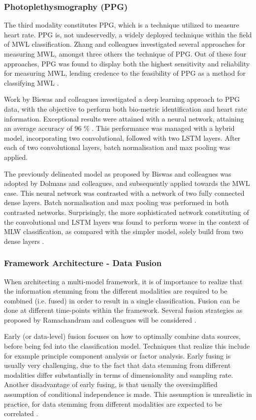 \documentclass{article}
\begin{document}
\subsubsection{Photoplethysmography (PPG)}
The third modality constitutes PPG, which is a technique utilized to measure heart rate. PPG is, not undeservedly, a widely deployed technique within the field of MWL classification. Zhang and colleagues investigated several approaches for measuring MWL, amongst three others the technique of PPG. Out of these four approaches, PPG was found to display both the highest sensitivity and reliability for measuring MWL, lending credence to the feasibility of PPG as a method for classifying MWL \cite{zhang2018evaluating}. 

Work by Biswas and colleagues investigated a deep learning approach to PPG data, with the objective to perform both bio-metric identification and heart rate information. Exceptional results were attained with a neural network, attaining an average accuracy of 96 \% \cite{biswas2019cornet}. This performance was managed with a hybrid model, incorporating two convolutional, followed with two LSTM layers. After each of two convolutional layers, batch normalisation and max pooling was applied. 

The previously delineated model as proposed by Biswas and colleagues was adopted by Dolmans and colleagues, and subsequently applied towards the MWL case. This neural network was contrasted with a network of two fully connected dense layers. Batch normalisation and max pooling was performed in both contrasted networks. Surprisingly, the more sophisticated network constituting of the convolutional and LSTM layers was found to perform worse in the context of MLW classification, as compared with the simpler model, solely build from two dense layers \cite{dolmans2020perceived}.   

\subsubsection{Framework Architecture - Data Fusion} 
When architecting a multi-model framework, it is of importance to realize that the information stemming from the different modalities are required to be combined (i.e. fused) in order to result in a single classification. Fusion can be done at different time-points within the framework. Several fusion strategies as proposed by Ramachandram and colleagues will be considered \cite{ramachandram2017deep}.

Early (or data-level) fusion focuses on how to optimally combine data sources, before being fed into the classification model. Techniques that realize this include for example principle component analysis or factor analysis. Early fusing is usually very challenging, due to the fact that data stemming from different modalities differ substantially in terms of dimensionality and sampling rate. Another disadvantage of early fusing, is that usually the oversimplified assumption of conditional independence is made. This assumption is unrealistic in practice, for data stemming from different modalities are expected to be correlated \cite{ramachandram2017deep}. 
\end{document}
